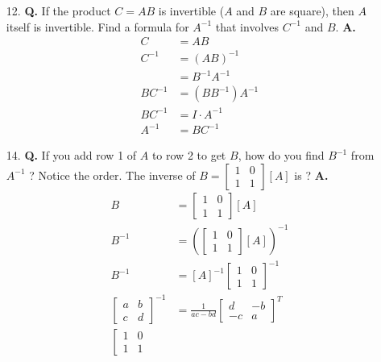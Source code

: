 \documentclass[main.tex]{subfiles}
\begin{document}
\begin{enumerate}
    \item [12.] \textbf{Q.} If the product $C=A B$ is invertible ($A$ and $B$ are square), then $A$ itself is invertible. Find a formula for $A^{-1}$ that involves $C^{-1}$ and $B$. \textbf{A.}
    $$
    \begin{aligned}
    C &= A B\\
    C^{-1} & = (A B)^{-1} \\
    & = B^{-1} A^{-1}\\
    B C^{-1} & =\left(B B^{-1}\right) A^{-1} \\
    B C^{-1} & =I \cdot A^{-1} \\
    A^{-1} & =B C^{-1}
    \end{aligned}
    $$
    
    \item [14.] \textbf{Q.} If you add row 1 of $A$ to row 2 to get $B$, how do you find $B^{-1}$ from $A^{-1}$ ? Notice the order. The inverse of $B=\left[\begin{array}{ll}1 & 0 \\ 1 & 1\end{array}\right][A]$ is ? 
    \textbf{A.}
    $$
    \begin{aligned}
    B &= \left[\begin{array}{ll}
    1 & 0 \\
    1 & 1
    \end{array}\right][A]\\
    B^{-1} &= \left(\left[\begin{array}{ll}
    1 & 0 \\
    1 & 1
    \end{array}\right][A]\right)^{-1} \\
    B^{-1} &= [A]^{-1}\left[\begin{array}{ll}
    1 & 0 \\
    1 & 1
    \end{array}\right]^{-1}\\
    \left[\begin{array}{ll}
    a & b \\
    c & d
    \end{array}\right]^{-1} &= \frac{1}{a c-b d}\left[\begin{array}{cc}
    d & -b \\
    -c & a
    \end{array}\right]^{T}\\
    \left[\begin{array}{ll}
    1 & 0 \\
    1 & 1

\end{array}
\end{aligned}$$
\end{enumerate}
\end{document}
